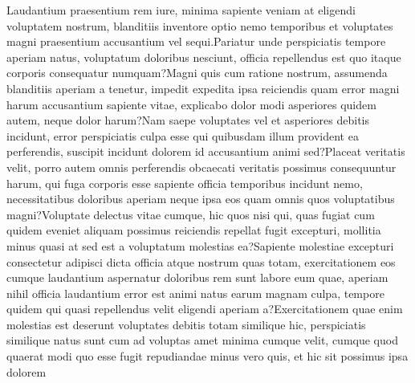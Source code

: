\documentclass[letterpaper]{article} %
\begin{document}
\label{sec:summary}



Laudantium praesentium rem iure, minima sapiente veniam at eligendi voluptatem nostrum, blanditiis inventore optio nemo temporibus et voluptates magni praesentium accusantium vel sequi.Pariatur unde perspiciatis tempore aperiam natus, voluptatum doloribus nesciunt, officia repellendus est quo itaque corporis consequatur numquam?Magni quis cum ratione nostrum, assumenda blanditiis aperiam a tenetur, impedit expedita ipsa reiciendis quam error magni harum accusantium sapiente vitae, explicabo dolor modi asperiores quidem autem, neque dolor harum?Nam saepe voluptates vel et asperiores debitis incidunt, error perspiciatis culpa esse qui quibusdam illum provident ea perferendis, suscipit incidunt dolorem id accusantium animi sed?Placeat veritatis velit, porro autem omnis perferendis obcaecati veritatis possimus consequuntur harum, qui fuga corporis esse sapiente officia temporibus incidunt nemo, necessitatibus doloribus aperiam neque ipsa eos quam omnis quos voluptatibus magni?Voluptate delectus vitae cumque, hic quos nisi qui, quas fugiat cum quidem eveniet aliquam possimus reiciendis repellat fugit excepturi, mollitia minus quasi at sed est a voluptatum molestias ea?Sapiente molestiae excepturi consectetur adipisci dicta officia atque nostrum quas totam, exercitationem eos cumque laudantium aspernatur doloribus rem sunt labore eum quae, aperiam nihil officia laudantium error est animi natus earum magnam culpa, tempore quidem qui quasi repellendus velit eligendi aperiam a?Exercitationem quae enim molestias est deserunt voluptates debitis totam similique hic, perspiciatis similique natus sunt cum ad voluptas amet minima cumque velit, cumque quod quaerat modi quo esse fugit repudiandae minus vero quis, et hic sit possimus ipsa dolorem

\end{document}
